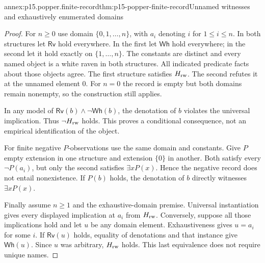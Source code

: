 \begin{annexitem}{annex:p15.popper.finite-record}{thm:p15-popper-finite-record}{Unnamed witnesses and exhaustively enumerated domains}
\begin{proof}
For \(n\geq0\) use domain \(\{0,1,\ldots,n\}\), with \(a_i\)
denoting \(i\) for \(1\leq i\leq n\).
In both structures let \(\mathsf{Rv}\) hold everywhere.
In the first let \(\mathsf{Wh}\) hold everywhere; in the second
let it hold exactly on \(\{1,\ldots,n\}\).
The constants are distinct and every named object is a white raven
in both structures. All indicated predicate facts about those
objects agree.
The first structure satisfies \(H_{\rm rw}\).
The second refutes it at the unnamed element \(0\).
For \(n=0\) the record is empty but both domains remain nonempty,
so the construction still applies.

In any model of
\(\mathsf{Rv}(b)\land\neg\mathsf{Wh}(b)\), the denotation of \(b\)
violates the universal implication. Thus \(\neg H_{\rm rw}\)
holds. This proves a conditional consequence, not an empirical
identification of the object.

For finite negative \(P\)-observations use the same domain and
constants. Give \(P\) empty extension in one structure and
extension \(\{0\}\) in another. Both satisfy every \(\neg P(a_i)\),
but only the second satisfies \(\exists xP(x)\).
Hence the negative record does not entail nonexistence.
If \(P(b)\) holds, the denotation of \(b\) directly witnesses
\(\exists xP(x)\).

Finally assume \(n\geq1\) and the exhaustive-domain premise.
Universal instantiation gives every displayed implication at \(a_i\)
from \(H_{\rm rw}\).
Conversely, suppose all those implications hold and let \(u\)
be any domain element. Exhaustiveness gives \(u=a_i\) for some
\(i\). If \(\mathsf{Rv}(u)\) holds, equality of denotations and
that instance give \(\mathsf{Wh}(u)\).
Since \(u\) was arbitrary, \(H_{\rm rw}\) holds.
This last equivalence does not require unique names.
\end{proof}
\end{annexitem}

